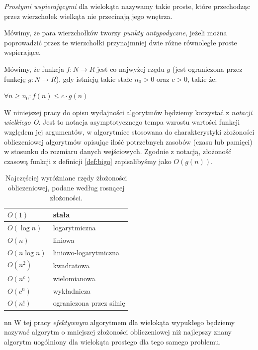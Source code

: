 \begin{definicja}
  \emph{Prostymi wspierającymi} dla wielokąta nazywamy takie proste,
  które przechodząc przez wierzchołek wielkąta nie przecinają jego
  wnętrza.
\end{definicja}

\begin{definicja}
  Mówimy, że para wierzchołków tworzy \emph{punkty antypodyczne},
  jeżeli można poprowadzić przez te wierzchołki przynajmniej dwie
  różne równoległe proste wspierające.
\end{definicja}

\begin{definicja}\label{def:bigo}
  Mówimy, że funkcja $f\colon N \to R$ jest co najwyżej rzędu $g$
  (jest ograniczona przez funkcję $g\colon N \to R$), gdy istnieją
  takie stałe $n_0 > 0$ oraz $c > 0$, takie że:

  \begin{center}
    $\forall n \geq n_0 : f(n) \leq c \cdot g(n)$
  \end{center}
\end{definicja}

W niniejszej pracy do opisu wydajności algorytmów będziemy korzystać
z \emph{notacji wielkiego O}. Jest to notacja asymptotycznego tempa
wzrostu wartości funkcji względem jej argumentów, w algorytmice
stosowana do charakterystyki złożoności obliczeniowej algorytmów
opisując ilość potrzebnych zasobów (czasu lub pamięci) w stosunku
do rozmiaru danych wejściowych. Zgodnie z notacją, złożoność czasową
funkcji z definicji \ref{def:bigo} zapisalibyśmy jako $O(g(n))$.

\begin{table}[htb]
  \centering

  \begin{tabular}{ll}
    \toprule
    $O(1)$ & stała \\
    \midrule
    $O(\log n)$ & logarytmiczna \\
    \midrule
    $O(n)$ & liniowa \\
    \midrule
    $O(n \log n)$ & liniowo-logarytmiczna \\
    \midrule
    $O(n^2)$ & kwadratowa \\
    \midrule
    $O(n^c)$ & wielomianowa \\
    \midrule
    $O(c^n)$ & wykładnicza \\
    \midrule
    $O(n!)$ & ograniczona przez silnię \\
    \bottomrule
  \end{tabular}

  \caption{Najczęściej wyróżniane rzędy żłożoności obliczeniowej,
    podane według rosnącej złożoności.}
\end{table}
nn
W tej pracy \emph{efektywnym} algorytmem dla wielokąta wypukłego będziemy
nazywać algorytm o mniejszej złożoności obliczeniowej niż najlepszy
znany algorytm uogólniony dla wielokąta prostego dla tego samego
problemu.

